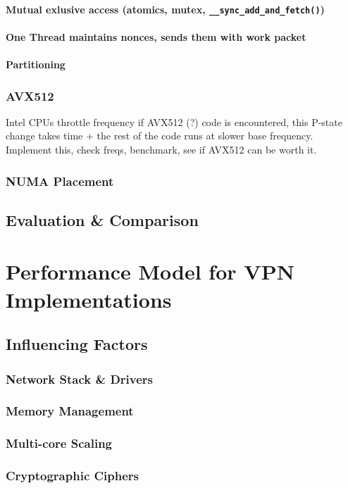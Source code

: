 \documentclass[IN,11pt,twoside,openright,master,english]{tumthesis}
\begin{document}
	\subsubsection{Mutual exlusive access (atomics, mutex, \texttt{\_\_sync\_add\_and\_fetch()})}
	\subsubsection{One Thread maintains nonces, sends them with work packet}
	\subsubsection{Partitioning}

\subsection{AVX512}
Intel CPUs throttle frequency if AVX512 (?) code is encountered, this P-state change takes time + the rest of the code runs at slower base frequency.
Implement this, check freqs, benchmark, see if AVX512 can be worth it.
\subsection{NUMA Placement}
\section{Evaluation \& Comparison}

\chapter{Performance Model for VPN Implementations}
\label{chap:perf_model}
\section{Influencing Factors}
	\subsection{Network Stack \& Drivers}
	\subsection{Memory Management}
	\subsection{Multi-core Scaling}
	\subsection{Cryptographic Ciphers}
\end{document}
